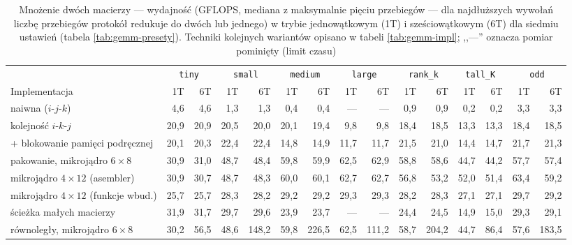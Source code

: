 \documentclass[a4paper,12pt]{book} %
\begin{document}
\begin{landscape}
\begin{table}
\centering
\caption{Mnożenie dwóch macierzy --- wydajność (GFLOPS, mediana z maksymalnie pięciu przebiegów --- dla najdłuższych wywołań liczbę przebiegów protokół redukuje do dwóch lub jednego) w trybie jednowątkowym (1T) i sześciowątkowym (6T) dla siedmiu ustawień (tabela \ref{tab:gemm-presety}). Techniki kolejnych wariantów opisano w tabeli \ref{tab:gemm-impl}; ,,---'' oznacza pomiar pominięty (limit czasu)}
\label{tab:wyniki-gemm}
\footnotesize
\setlength{\tabcolsep}{4.5pt}
\begin{tabular}{l rr rr rr rr rr rr rr}
\hline
 & \multicolumn{2}{c}{\texttt{tiny}} & \multicolumn{2}{c}{\texttt{small}} & \multicolumn{2}{c}{\texttt{medium}} & \multicolumn{2}{c}{\texttt{large}} & \multicolumn{2}{c}{\texttt{rank\_k}} & \multicolumn{2}{c}{\texttt{tall\_K}} & \multicolumn{2}{c}{\texttt{odd}} \\
Implementacja & 1T & 6T & 1T & 6T & 1T & 6T & 1T & 6T & 1T & 6T & 1T & 6T & 1T & 6T \\
\hline
naiwna ($i$-$j$-$k$)                     &  4,6 &   4,6 &  1,3 &   1,3 &  0,4 &   0,4 &  --- &   --- &  0,9 &   0,9 &  0,2 &   0,2 &  3,3 &   3,3 \\
kolejność $i$-$k$-$j$                    & 20,9 &  20,9 & 20,5 &  20,0 & 20,1 &  19,4 &  9,8 &   9,8 & 18,4 &  18,5 & 13,3 &  13,3 & 18,4 &  18,5 \\
{}+ blokowanie pamięci podręcznej        & 20,1 &  20,3 & 22,4 &  22,4 & 14,8 &  14,9 & 11,7 &  11,7 & 21,5 &  21,0 & 14,4 &  14,7 & 21,7 &  21,3 \\
pakowanie, mikrojądro $6 \times 8$         & 30,9 &  31,0 & 48,7 &  48,4 & 59,8 &  59,9 & 62,5 &  62,9 & 58,8 &  58,6 & 44,7 &  44,2 & 57,7 &  57,4 \\
mikrojądro $4 \times 12$ (asembler)      & 30,9 &  30,7 & 48,7 &  48,3 & 60,0 &  60,1 & 62,7 &  62,7 & 56,8 &  53,2 & 52,0 &  51,4 & 63,4 &  59,2 \\
mikrojądro $4 \times 12$ (funkcje wbud.) & 25,7 &  25,7 & 28,3 &  28,2 & 29,2 &  29,2 & 29,3 &  29,3 & 28,2 &  28,3 & 27,1 &  27,1 & 29,7 &  29,2 \\
ścieżka małych macierzy                  & 31,9 &  31,7 & 29,7 &  29,6 & 23,9 &  23,7 &  --- &   --- & 24,4 &  24,5 & 14,9 &  15,0 & 29,3 &  29,1 \\
równoległy, mikrojądro $6 \times 8$      & 30,2 &  56,5 & 48,6 & 148,2 & 59,8 & 226,5 & 62,5 & 111,2 & 58,7 & 204,2 & 44,7 &  86,4 & 57,6 & 183,5 \\

\end{tabular}
\end{table}
\end{landscape}
\end{document}
